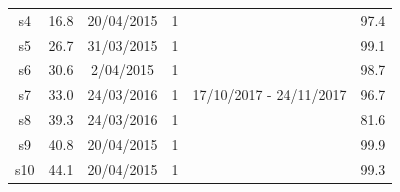 \begin{table}
\begin{tabular}{c|ccccc}
s4                                                  & 16.8                                                    & 20/04/2015                                                & 1                                                       &                         & 97.4                                                                    \\ 
s5                                                  & 26.7                                                    & 31/03/2015                                                & 1                                                       &                         & 99.1                                                                    \\ 
s6                                                  & 30.6                                                    & 2/04/2015                                                 & 1                                                       &                         & 98.7                                                                    \\ 
s7                                                  & 33.0                                                    & 24/03/2016                                                & 1                                                       & 17/10/2017 - 24/11/2017 & 96.7                                                                    \\ 
s8                                                  & 39.3                                                    & 24/03/2016                                                & 1                                                       &                         & 81.6                                                                    \\ 
s9                                                  & 40.8                                                    & 20/04/2015                                                & 1                                                       &                         & 99.9                                                                    \\ 
s10                                                 & 44.1                                                    & 20/04/2015                                                & 1                                                       &                         & 99.3                                                                    \\ 

\end{tabular}
\end{table}
